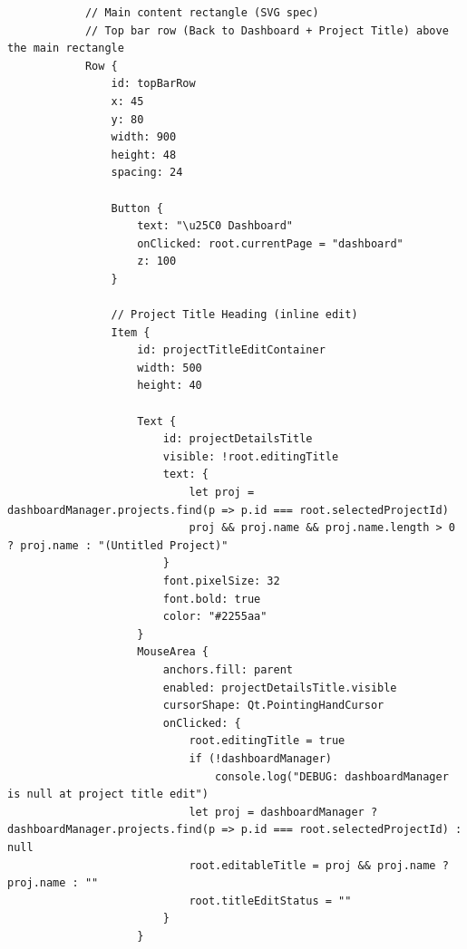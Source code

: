 \documentclass{report}
\begin{document}
\begin{lstlisting}
            // Main content rectangle (SVG spec)
            // Top bar row (Back to Dashboard + Project Title) above the main rectangle
            Row {
                id: topBarRow
                x: 45
                y: 80
                width: 900
                height: 48
                spacing: 24

                Button {
                    text: "\u25C0 Dashboard"
                    onClicked: root.currentPage = "dashboard"
                    z: 100
                }

                // Project Title Heading (inline edit)
                Item {
                    id: projectTitleEditContainer
                    width: 500
                    height: 40

                    Text {
                        id: projectDetailsTitle
                        visible: !root.editingTitle
                        text: {
                            let proj = dashboardManager.projects.find(p => p.id === root.selectedProjectId)
                            proj && proj.name && proj.name.length > 0 ? proj.name : "(Untitled Project)"
                        }
                        font.pixelSize: 32
                        font.bold: true
                        color: "#2255aa"
                    }
                    MouseArea {
                        anchors.fill: parent
                        enabled: projectDetailsTitle.visible
                        cursorShape: Qt.PointingHandCursor
                        onClicked: {
                            root.editingTitle = true
                            if (!dashboardManager)
                                console.log("DEBUG: dashboardManager is null at project title edit")
                            let proj = dashboardManager ? dashboardManager.projects.find(p => p.id === root.selectedProjectId) : null
                            root.editableTitle = proj && proj.name ? proj.name : ""
                            root.titleEditStatus = ""
                        }
                    }


\end{lstlisting}
\end{document}
